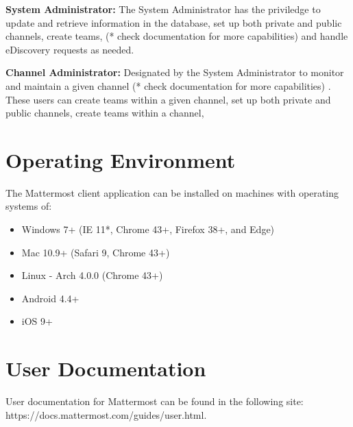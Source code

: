\documentclass{scrreprt}
\newcommand\tab[1][0.5cm]{\hspace*{#1}}
\begin{document}
\noindent
\textbf{System Administrator:}
\tab The System Administrator has the priviledge to update and retrieve
information in the database, set up both private and public channels, create teams, (* check documentation for more capabilities) and handle eDiscovery requests as needed.

\noindent
\textbf{Channel Administrator:}
\tab Designated by the System Administrator to monitor and maintain a given channel   (* check documentation for more capabilities) .  These users can create teams within a given channel, set up both private and public channels, create teams within a channel, 

\section{Operating Environment}
The Mattermost client application can be installed on machines with operating
systems of:
\begin{itemize}
\item Windows 7+ (IE 11*, Chrome 43+, Firefox 38+, and Edge)
\item Mac 10.9+ (Safari 9, Chrome 43+)
\item Linux - Arch 4.0.0 (Chrome 43+)
\item Android 4.4+
\item iOS 9+
\end{itemize}

\section{User Documentation}
User documentation for Mattermost can be found in the following site:\\
https://docs.mattermost.com/guides/user.html.

\end{document}
